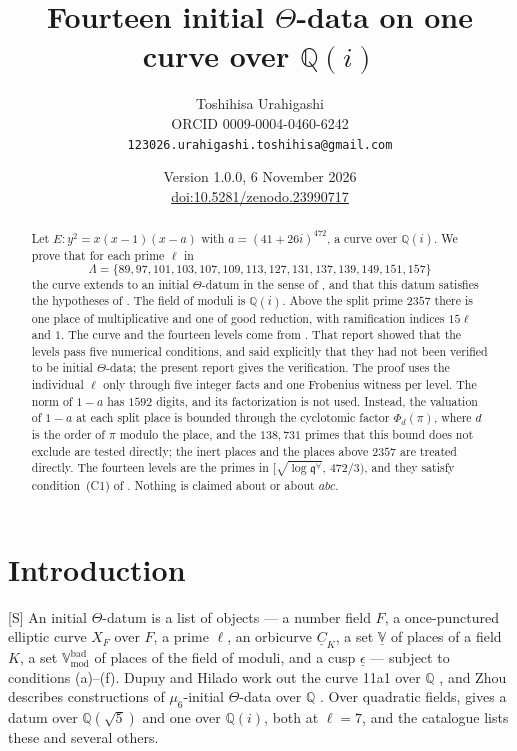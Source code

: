 \documentclass[11pt,a4paper]{article}
\title{Fourteen initial $\Theta$-data on one curve over $\mathbb{Q}(i)$}
\author{Toshihisa Urahigashi\\\small ORCID 0009-0004-0460-6242\\\small\texttt{123026.urahigashi.toshihisa@gmail.com}}
\date{Version 1.0.0, 6 November 2026\\\small\href{https://doi.org/10.5281/zenodo.23990717}{doi:10.5281/zenodo.23990717}}
\newcommand{\Q}{\mathbb{Q}}
\newcommand{\Vbadmod}{\mathbb{V}^{\mathrm{bad}}_{\mathrm{mod}}}
\newcommand{\VV}{\underline{\mathbb{V}}}
\newcommand{\tS}{\textup{[S]}}
\theoremstyle{plain}
\theoremstyle{definition}
\begin{document}
\maketitle

\begin{abstract}
Let $E\colon y^2=x(x-1)(x-a)$ with $a=(41+26i)^{472}$, a curve over $\Q(i)$. We prove that for each prime $\ell$ in
\[
 \Lambda=\{89,97,101,103,107,109,113,127,131,137,139,149,151,157\}
\]
the curve extends to an initial $\Theta$-datum in the sense of \cite[Def.~3.1]{IUT1}, and that this datum satisfies
the hypotheses of \cite[Thm.~1.10]{IUT4}. The field of moduli is $\Q(i)$. Above the split prime $2357$ there is one
place of multiplicative and one of good reduction, with ramification indices $15\ell$ and $1$. The curve and the
fourteen levels come from \cite[\S13]{Second}. That report showed that the levels pass five numerical conditions, and
said explicitly that they had not been verified to be initial $\Theta$-data; the present report gives the verification.
The proof uses the individual $\ell$ only through five integer facts and one Frobenius witness per level. The norm of
$1-a$ has $1592$ digits, and its factorization is not used. Instead, the valuation of $1-a$ at each split place is
bounded through the cyclotomic factor $\Phi_d(\pi)$, where $d$ is the order of $\pi$ modulo the place, and the
$138{,}731$ primes that this bound does not exclude are tested directly; the inert places and the places above $2357$
are treated directly. The fourteen levels are the primes in
$[\sqrt{\log\mathfrak q^{\forall}},\,472/3)$, and they satisfy condition~(C1) of \cite[Cor.~2.2]{IUT4}. Nothing is
claimed about \cite[Cor.~3.12]{IUT3} or about $abc$.
\end{abstract}

\section{Introduction}\label{s:intro}

\tS{} An initial $\Theta$-datum \cite[Def.~3.1]{IUT1} is a list of objects --- a number field $F$, a once-punctured
elliptic curve $X_F$ over $F$, a prime $\ell$, an orbicurve $\underline C_K$, a set $\VV$ of places of a field $K$, a
set $\Vbadmod$ of places of the field of moduli, and a cusp $\underline\epsilon$ --- subject to conditions (a)--(f).
Dupuy and Hilado work out the curve 11a1 over $\Q$
\cite[\S2.10]{DH1}, and Zhou describes constructions of $\mu_6$-initial $\Theta$-data over $\Q$
\cite[Prop.~2.5, Lemma~2.6]{Zhou1}. Over quadratic fields, \cite{First} gives a datum over $\Q(\sqrt5)$ and
\cite{Second} one over $\Q(i)$, both at $\ell=7$, and the catalogue \cite{Cat} lists these and several others.
\end{document}
